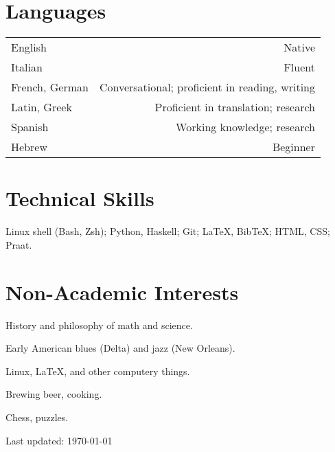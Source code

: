 \documentclass[11pt,letterpaper,twoside]{article}
\makeatletter
\newenvironment{cvsection}{%
  \renewcommand{\arraystretch}{1.75}
  \begin{longtable}[l]{@{} L R @{}}
}{%
  \end{longtable}
}
\makeatother
\begin{document}
\section*{Languages}

\begin{cvsection}
  English & Native\\
  Italian & Fluent\\
  French, German & Conversational; proficient in reading, writing\\
  Latin, Greek & Proficient in translation; research\\
  Spanish & Working knowledge; research\\
  Hebrew & Beginner\\
\end{cvsection}

\section*{Technical Skills}

Linux shell (Bash, Zsh); Python, Haskell; Git; \LaTeX, Bib\TeX; HTML, CSS; Praat.

\section*{Non-Academic Interests}

\begin{list}{}{\leftmargin=0pt}
  \item History and philosophy of math and science.
  \item Early American blues (Delta) and jazz (New Orleans).
  \item Linux, \LaTeX{}, and other computery things.
  \item Brewing beer, cooking.
  \item Chess, puzzles.
\end{list}

\null\hfill {\footnotesize Last updated: \today}
\end{document}
